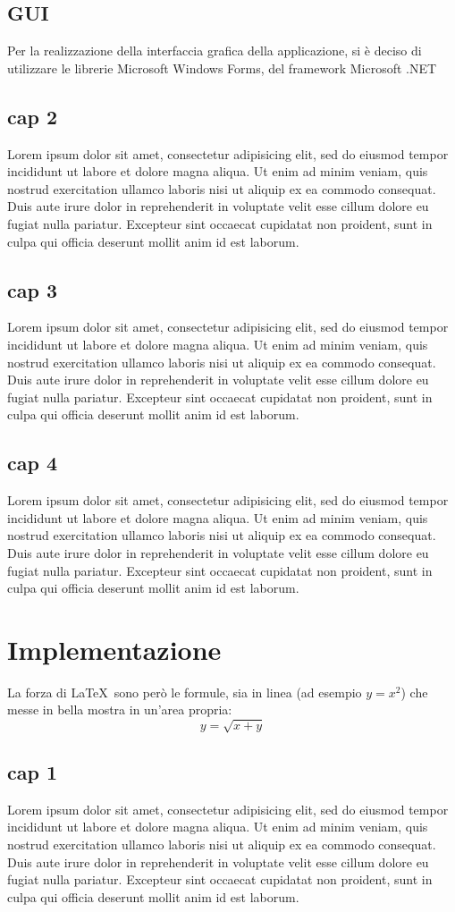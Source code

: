 \documentclass[a4paper,10pt]{report} %
\begin{document}
  \section{GUI}
			Per la realizzazione della interfaccia grafica della applicazione, si è deciso
			di utilizzare le librerie Microsoft Windows Forms, del framework Microsoft .NET
  \section{cap 2}
    Lorem ipsum dolor sit amet, consectetur adipisicing elit, sed do eiusmod tempor incididunt ut labore et dolore magna aliqua. Ut enim ad minim veniam, quis nostrud exercitation ullamco laboris nisi ut aliquip ex ea commodo consequat. Duis aute irure dolor in reprehenderit in voluptate velit esse cillum dolore eu fugiat nulla pariatur. Excepteur sint occaecat cupidatat non proident, sunt in culpa qui officia deserunt mollit anim id est laborum.
  \section{cap 3}
    Lorem ipsum dolor sit amet, consectetur adipisicing elit, sed do eiusmod tempor incididunt ut labore et dolore magna aliqua. Ut enim ad minim veniam, quis nostrud exercitation ullamco laboris nisi ut aliquip ex ea commodo consequat. Duis aute irure dolor in reprehenderit in voluptate velit esse cillum dolore eu fugiat nulla pariatur. Excepteur sint occaecat cupidatat non proident, sunt in culpa qui officia deserunt mollit anim id est laborum.
  \section{cap 4}
    Lorem ipsum dolor sit amet, consectetur adipisicing elit, sed do eiusmod tempor incididunt ut labore et dolore magna aliqua. Ut enim ad minim veniam, quis nostrud exercitation ullamco laboris nisi ut aliquip ex ea commodo consequat. Duis aute irure dolor in reprehenderit in voluptate velit esse cillum dolore eu fugiat nulla pariatur. Excepteur sint occaecat cupidatat non proident, sunt in culpa qui officia deserunt mollit anim id est laborum.
\newpage
\chapter{Implementazione} %
  La forza di \LaTeX\ sono però le formule, sia in linea (ad esempio \(y=x^2\))
   che messe in bella mostra in un'area propria:
  \[y=\sqrt{x+y}\]
  \section{cap 1}
    Lorem ipsum dolor sit amet, consectetur adipisicing elit, sed do eiusmod tempor incididunt ut labore et dolore magna aliqua. Ut enim ad minim veniam, quis nostrud exercitation ullamco laboris nisi ut aliquip ex ea commodo consequat. Duis aute irure dolor in reprehenderit in voluptate velit esse cillum dolore eu fugiat nulla pariatur. Excepteur sint occaecat cupidatat non proident, sunt in culpa qui officia deserunt mollit anim id est laborum.
\end{document}
